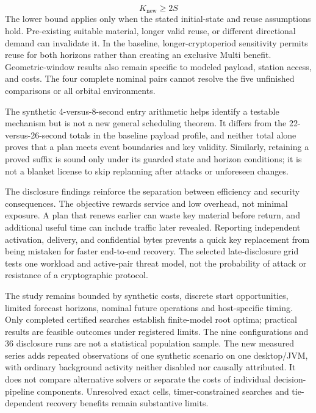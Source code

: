 \documentclass[12pt,a4paper]{article}
\begin{document}
\begin{equation}K_{\mathrm{new}}\geq 2S\tag{3}\end{equation}
The lower bound applies only when the stated initial-state and reuse assumptions hold. Pre-existing suitable material, longer valid reuse, or different directional demand can invalidate it. In the baseline, longer-cryptoperiod sensitivity permits reuse for both horizons rather than creating an exclusive Multi benefit. Geometric-window results also remain specific to modeled payload, station access, and costs. The four complete nominal pairs cannot resolve the five unfinished comparisons or all orbital environments.

The synthetic 4-versus-8-second entry arithmetic helps identify a testable mechanism but is not a new general scheduling theorem. It differs from the 22-versus-26-second totals in the baseline payload profile, and neither total alone proves that a plan meets event boundaries and key validity. Similarly, retaining a proved suffix is sound only under its guarded state and horizon conditions; it is not a blanket license to skip replanning after attacks or unforeseen changes.

The disclosure findings reinforce the separation between efficiency and security consequences. The objective rewards service and low overhead, not minimal exposure. A plan that renews earlier can waste key material before return, and additional useful time can include traffic later revealed. Reporting independent activation, delivery, and confidential bytes prevents a quick key replacement from being mistaken for faster end-to-end recovery. The selected late-disclosure grid tests one workload and active-pair threat model, not the probability of attack or resistance of a cryptographic protocol.

The study remains bounded by synthetic costs, discrete start opportunities, limited forecast horizons, nominal future operations and host-specific timing. Only completed certified searches establish finite-model root optima; practical results are feasible outcomes under registered limits. The nine configurations and 36 disclosure runs are not a statistical population sample. The new measured series adds repeated observations of one synthetic scenario on one desktop/JVM, with ordinary background activity neither disabled nor causally attributed. It does not compare alternative solvers or separate the costs of individual decision-pipeline components. Unresolved exact cells, timer-constrained searches and tie-dependent recovery benefits remain substantive limits.
\end{document}
